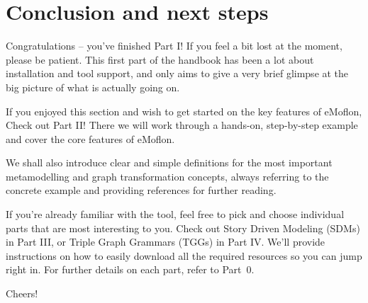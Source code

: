 \newpage \genHeader

\vspace*{2cm}

\hypertarget{conclusion}{} 
\section{Conclusion and next steps}
\vspace{0.5cm}

Congratulations -- you've finished Part I! If you feel a bit lost at the moment, please be patient. This first part of the handbook has been a lot about
installation and tool support, and only aims to give a very brief glimpse at the big picture of what is actually going on.

If you enjoyed this section and wish to get started on the key features of eMoflon, Check out Part II! There we will work through a hands-on, step-by-step
example and cover the core features of eMoflon.

We shall also introduce clear and simple definitions for the most important metamodelling and graph transformation concepts, always referring to the concrete
example and providing references for further reading.

If you're already familiar with the tool, feel free to pick and choose individual parts that are most interesting to you. Check out Story Driven Modeling (SDMs)
in Part III, or Triple Graph Grammars (TGGs) in Part IV. We'll provide instructions on how to easily download all the required resources so you can jump
right in. For further details on each part, refer to Part~0.

Cheers!